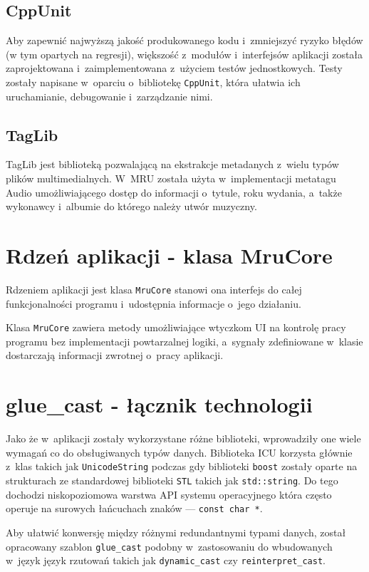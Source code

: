 \subsection{CppUnit}
\par
Aby zapewnić najwyższą jakość produkowanego kodu i~zmniejszyć ryzyko błędów (w tym opartych na regresji), większość z~modułów i~interfejsów aplikacji została zaprojektowana i~zaimplementowana z~użyciem testów jednostkowych. Testy zostały napisane w~oparciu o~bibliotekę \texttt{CppUnit}, która ułatwia ich uruchamianie, debugowanie i~zarządzanie nimi.

\subsection{TagLib}
TagLib jest biblioteką pozwalającą na ekstrakcje metadanych z~wielu typów plików multimedialnych. W~MRU została użyta w~implementacji metatagu Audio umożliwiającego dostęp do informacji o~tytule, roku wydania, a~także wykonawcy i~albumie do którego należy utwór muzyczny.

\section{Rdzeń aplikacji - klasa MruCore}
Rdzeniem aplikacji jest klasa \texttt{MruCore} stanowi ona interfejs do całej funkcjonalności programu i~udostępnia informacje o~jego działaniu.
\par
Klasa \texttt{MruCore} zawiera metody umożliwiające wtyczkom UI na kontrolę pracy programu bez implementacji powtarzalnej logiki, a~sygnały zdefiniowane w~klasie dostarczają informacji zwrotnej o~pracy aplikacji.

\section{glue\_cast - łącznik technologii}
Jako że w~aplikacji zostały wykorzystane różne biblioteki, wprowadziły one wiele wymagań co do obsługiwanych typów danych.
Biblioteka ICU korzysta głównie z~klas takich jak \texttt{UnicodeString} podczas gdy biblioteki \texttt{boost} zostały oparte na strukturach ze standardowej biblioteki \texttt{STL} takich jak \texttt{std::string}. Do tego dochodzi niskopoziomowa warstwa API systemu operacyjnego która często operuje na surowych łańcuchach znaków --- \texttt{const char *}.
\par
Aby ułatwić konwersję między różnymi redundantnymi typami danych, został opracowany szablon \texttt{glue\_cast} podobny w~zastosowaniu do wbudowanych w~język język rzutowań takich jak \texttt{dynamic\_cast} czy \texttt{reinterpret\_cast}.

